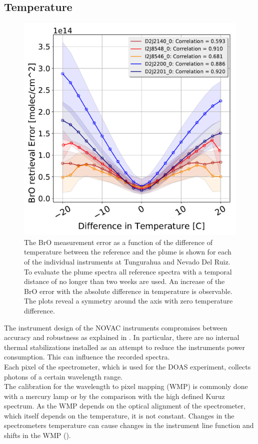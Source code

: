 \subsection{Temperature}
\begin{figure}
	\centering
	\includegraphics[width=0.7\linewidth]{Bilder/DiffTempallInstruments}
	\caption{The BrO measurement error as a function of the difference of temperature between the reference and the plume is shown for each of the individual instruments at Tungurahua and Nevado Del Ruiz. To evaluate the plume spectra all reference spectra with a temporal distance of no longer than two weeks are used. An increase of the BrO error with the absolute difference in temperature is observable. The plots reveal a symmetry around the axis with zero temperature difference.}
	\label{fig:difftemp}
\end{figure}
The instrument design of the NOVAC instruments compromises between accuracy and robustness as explained in . In particular, there are no internal thermal stabilizations installed as an attempt to reduce the instruments power consumption. This can influence the recorded spectra.\\	
Each pixel of the spectrometer, which is used for the DOAS experiment, collects photons of a certain wavelength range.\\
The calibration for the wavelength to pixel mapping (WMP) is commonly done with a mercury lamp or by the comparison with the high defined Kuruz spectrum.
As the WMP depends on the optical alignment of the spectrometer, which itself depends on the temperature, it is not constant.
Changes in the spectrometers temperature can cause changes in the instrument line function and shifts in the WMP (\citep{pinardi2007influence}). 
